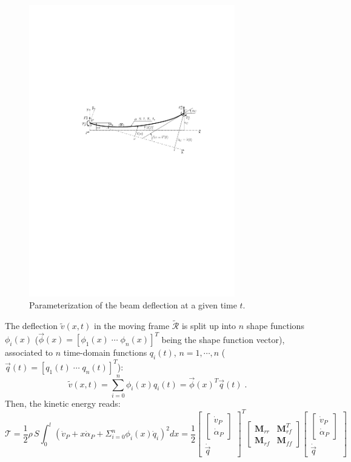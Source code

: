 \documentclass[smallcondensed]{svjour3}     %
\begin{document}
\begin{figure}[htbp!]
  \includegraphics[width=0.8\textwidth]{flexion_5b}
\caption{Parameterization of the beam deflection at a given time $t$.}
\label{fig:flexion_5} 
\end{figure}
The deflection $\widetilde{v}(x,t)$ in the moving frame $\widetilde{\mathcal{R}}$  is split up into $n$ shape functions $\phi_i(x)$ ($\vec{\phi}(x)=[\phi_1(x)\;\cdots\; \phi_n(x)]^T$ being the shape function vector), associated to $n$ time-domain functions $q_i(t)$, $n=1,\cdots,n$ ($\vec{q}(t)=[q_1(t)\;\cdots\; q_n(t)]^T$):
\begin{equation}\label{eq:decomp}
\widetilde{v}(x,t)=\sum_{i=0}^{n}\phi_i(x)q_i(t)=\vec{\phi}(x)^T\vec{q}(t)\;.
\end{equation}
Then, the kinetic energy reads:
\[
\mathcal{T}=\frac{1}{2}\rho\,S\int_0^l(\dot{v}_P+x\dot{\alpha}_P+\Sigma_{i=0}^{n}\phi_i(x)\dot{q}_i)^2dx=\frac{1}{2}\left[\begin{array}{c}\left[\begin{array}{c}\dot{v}_P\\\dot{\alpha}_P\end{array}\right] \\ \dot{\vec{q}} \end{array}\right]^T\left[\begin{array}{cc}\mathbf{M}_{rr} & \mathbf{M}_{rf}^T \\\mathbf{M}_{rf} & \mathbf{M}_{ff} \end{array}\right]\left[\begin{array}{c}\left[\begin{array}{c}\dot{v}_P\\\dot{\alpha}_P\end{array}\right] \\ \dot{\vec{q}} \end{array}\right]
\]
\end{document}
